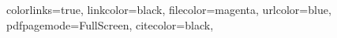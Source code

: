 \hypersetup
{
    colorlinks=true,
    linkcolor=black,
    filecolor=magenta,      
    urlcolor=blue,
    pdfpagemode=FullScreen,
    citecolor=black,
}
